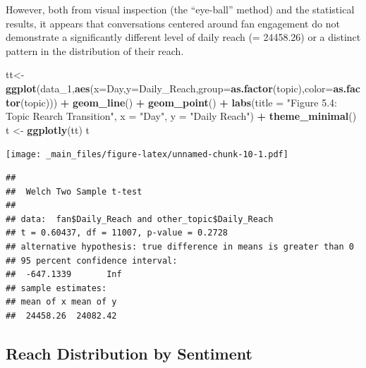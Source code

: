 \documentclass[
]{book}
\newenvironment{Shaded}{\begin{snugshade}}{\end{snugshade}}
\newcommand{\AttributeTok}[1]{\textcolor[rgb]{0.13,0.29,0.53}{#1}}
\newcommand{\ConstantTok}[1]{\textcolor[rgb]{0.56,0.35,0.01}{#1}}
\newcommand{\FunctionTok}[1]{\textcolor[rgb]{0.13,0.29,0.53}{\textbf{#1}}}
\newcommand{\NormalTok}[1]{#1}
\newcommand{\OtherTok}[1]{\textcolor[rgb]{0.56,0.35,0.01}{#1}}
\newcommand{\SpecialCharTok}[1]{\textcolor[rgb]{0.81,0.36,0.00}{\textbf{#1}}}
\newcommand{\StringTok}[1]{\textcolor[rgb]{0.31,0.60,0.02}{#1}}
\begin{document}
However, both from visual inspection (the ``eye-ball'' method) and the statistical results, it appears that conversations centered around fan engagement do not demonstrate a significantly different level of daily reach (\mu = 24458.26) or a distinct pattern in the distribution of their reach.

\begin{Shaded}
\begin{Highlighting}[]
\NormalTok{tt}\OtherTok{\textless{}{-}}\FunctionTok{ggplot}\NormalTok{(data\_1,}\FunctionTok{aes}\NormalTok{(}\AttributeTok{x=}\NormalTok{Day,}\AttributeTok{y=}\NormalTok{Daily\_Reach,}\AttributeTok{group=}\FunctionTok{as.factor}\NormalTok{(topic),}\AttributeTok{color=}\FunctionTok{as.factor}\NormalTok{(topic))) }\SpecialCharTok{+}
  \FunctionTok{geom\_line}\NormalTok{() }\SpecialCharTok{+} \FunctionTok{geom\_point}\NormalTok{() }\SpecialCharTok{+}
  \FunctionTok{labs}\NormalTok{(}\AttributeTok{title =} \StringTok{"Figure 5.4: Topic Rearch Transition"}\NormalTok{, }\AttributeTok{x =} \StringTok{"Day"}\NormalTok{, }\AttributeTok{y =} \StringTok{"Daily Reach"}\NormalTok{) }\SpecialCharTok{+}
  \FunctionTok{theme\_minimal}\NormalTok{()}
\NormalTok{t }\OtherTok{\textless{}{-}} \FunctionTok{ggplotly}\NormalTok{(tt)}
\NormalTok{t}
\end{Highlighting}
\end{Shaded}

\texttt{[image: \_main\_files/figure-latex/unnamed-chunk-10-1.pdf]}

\begin{Shaded}
\end{Shaded}

\begin{verbatim}
## 
##  Welch Two Sample t-test
## 
## data:  fan$Daily_Reach and other_topic$Daily_Reach
## t = 0.60437, df = 11007, p-value = 0.2728
## alternative hypothesis: true difference in means is greater than 0
## 95 percent confidence interval:
##  -647.1339       Inf
## sample estimates:
## mean of x mean of y 
##  24458.26  24082.42
\end{verbatim}

\hypertarget{reach-distribution-by-sentiment}{%
\subsection{Reach Distribution by Sentiment}\label{reach-distribution-by-sentiment}}
\end{document}
